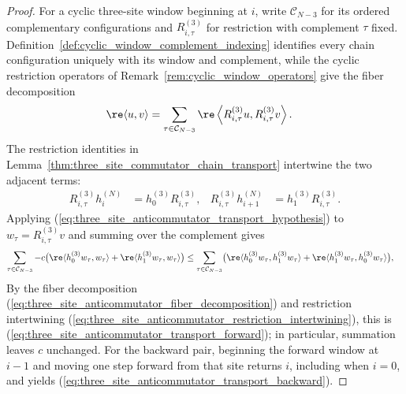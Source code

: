 \begin{proof}
    \leanok
    For a cyclic three-site window beginning at $i$, write
    $\mathcal C_{N-3}$ for its ordered complementary configurations and
    $R_{i,\tau}^{(3)}$ for restriction with complement $\tau$ fixed.
    Definition~\ref{def:cyclic_window_complement_indexing} identifies every
    chain configuration uniquely with its window and complement, while the
    cyclic restriction operators of Remark~\ref{rem:cyclic_window_operators}
    give the fiber decomposition
    \begin{align}
        \re\langle u,v\rangle
         & =\sum_{\tau\in\mathcal C_{N-3}}
        \re\left\langle R_{i,\tau}^{(3)}u,
        R_{i,\tau}^{(3)}v\right\rangle.
        \label{eq:three_site_anticommutator_fiber_decomposition}
    \end{align}
    The restriction identities in
    Lemma~\ref{thm:three_site_commutator_chain_transport} intertwine the two
    adjacent terms:
    \begin{align}
        R_{i,\tau}^{(3)}h_i^{(N)}
         & =h_0^{(3)}R_{i,\tau}^{(3)},
         &
        R_{i,\tau}^{(3)}h_{i+1}^{(N)}
         & =h_1^{(3)}R_{i,\tau}^{(3)}.
        \label{eq:three_site_anticommutator_restriction_intertwining}
    \end{align}
    Applying
    (\ref{eq:three_site_anticommutator_transport_hypothesis}) to
    $w_\tau=R_{i,\tau}^{(3)}v$ and summing over the complement gives
    \begin{align}
        \sum_{\tau\in\mathcal C_{N-3}}
        -c\bigl(\re\langle h_0^{(3)}w_\tau,w_\tau\rangle
        +\re\langle h_1^{(3)}w_\tau,w_\tau\rangle\bigr)
         & \leq
        \sum_{\tau\in\mathcal C_{N-3}}
        \bigl(\re\langle h_0^{(3)}w_\tau,h_1^{(3)}w_\tau\rangle
        +\re\langle h_1^{(3)}w_\tau,h_0^{(3)}w_\tau\rangle\bigr),
        \label{eq:three_site_anticommutator_fiber_sum}
    \end{align}
    By the fiber decomposition
    (\ref{eq:three_site_anticommutator_fiber_decomposition}) and restriction
    intertwining (\ref{eq:three_site_anticommutator_restriction_intertwining}),
    this is (\ref{eq:three_site_anticommutator_transport_forward}); in
    particular, summation leaves $c$ unchanged. For the backward
    pair, beginning the forward window at $i-1$ and moving one step forward
    from that site returns $i$, including when $i=0$, and yields
    (\ref{eq:three_site_anticommutator_transport_backward}).
\end{proof}

